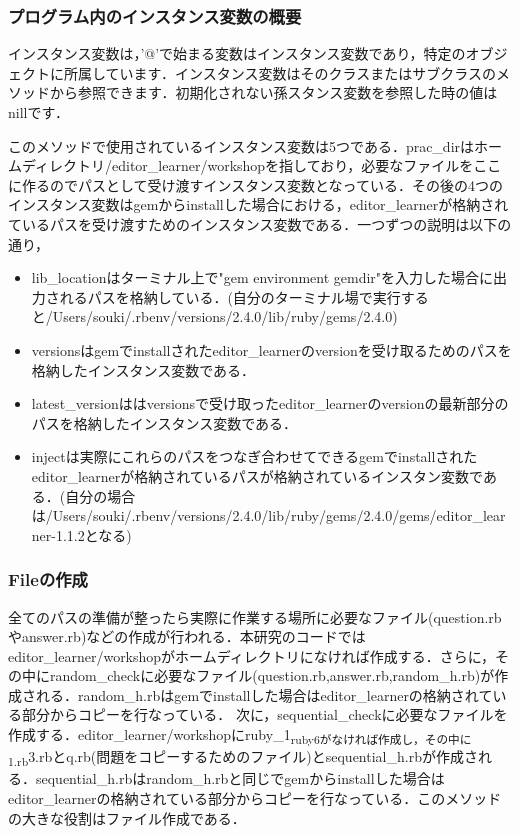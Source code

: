 \documentclass[11pt,dvipdfmx]{jsarticle}
\providecommand{\tightlist}{%
      \setlength{\itemsep}{0pt}\setlength{\parskip}{0pt}}
\begin{document}
\subsubsection{プログラム内のインスタンス変数の概要}\label{ux30d7ux30edux30b0ux30e9ux30e0ux5185ux306eux30a4ux30f3ux30b9ux30bfux30f3ux30b9ux5909ux6570ux306eux6982ux8981}

インスタンス変数は，'@'で始まる変数はインスタンス変数であり，特定のオブジェクトに所属しています．インスタンス変数はそのクラスまたはサブクラスのメソッドから参照できます．初期化されない孫スタンス変数を参照した時の値はnillです．

このメソッドで使用されているインスタンス変数は5つである．prac\_dirはホームディレクトリ/editor\_learner/workshopを指しており，必要なファイルをここに作るのでパスとして受け渡すインスタンス変数となっている．その後の4つのインスタンス変数はgemからinstallした場合における，editor\_learnerが格納されているパスを受け渡すためのインスタンス変数である．一つずつの説明は以下の通り，

\begin{itemize}
\tightlist
\item
  lib\_locationはターミナル上で"gem environment
  gemdir"を入力した場合に出力されるパスを格納している．(自分のターミナル場で実行すると/Users/souki/.rbenv/versions/2.4.0/lib/ruby/gems/2.4.0)
\item
  versionsはgemでinstallされたeditor\_learnerのversionを受け取るためのパスを格納したインスタンス変数である．
\item
  latest\_versionははversionsで受け取ったeditor\_learnerのversionの最新部分のパスを格納したインスタンス変数である．
\item
  injectは実際にこれらのパスをつなぎ合わせてできるgemでinstallされたeditor\_learnerが格納されているパスが格納されているインスタン変数である．(自分の場合は/Users/souki/.rbenv/versions/2.4.0/lib/ruby/gems/2.4.0/gems/editor\_learner-1.1.2となる)
\end{itemize}

\subsubsection{Fileの作成}\label{fileux306eux4f5cux6210}

全てのパスの準備が整ったら実際に作業する場所に必要なファイル(question.rbやanswer.rb)などの作成が行われる．本研究のコードではeditor\_learner/workshopがホームディレクトリになければ作成する．さらに，その中にrandom\_checkに必要なファイル(question.rb,answer.rb,random\_h.rb)が作成される．random\_h.rbはgemでinstallした場合はeditor\_learnerの格納されている部分からコピーを行なっている．
次に，sequential\_checkに必要なファイルを作成する．editor\_learner/workshopにruby\_1\textsubscript{ruby6がなければ作成し，その中に1.rb}3.rbとq.rb(問題をコピーするためのファイル)とsequential\_h.rbが作成される．sequential\_h.rbはrandom\_h.rbと同じでgemからinstallした場合はeditor\_learnerの格納されている部分からコピーを行なっている．このメソッドの大きな役割はファイル作成である．
\end{document}
